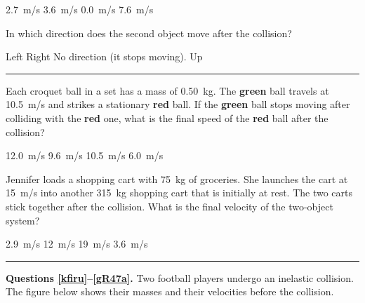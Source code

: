 \documentclass[]{exam}
\begin{document}
\begin{questions}
\begin{randomizechoices}
\correctchoice \SI{2.7}{m/s}
\choice \SI{3.6}{m/s}
\choice \SI{0.0}{m/s}
\choice \SI{7.6}{m/s}
\end{randomizechoices}

 \question \label{last_question}
 In which direction does the second object move after the collision?

\begin{randomizechoices}
\correctchoice Left
\choice Right
\choice No direction (it stops moving).
\choice Up
\end{randomizechoices}

\bigskip

\hrule

\clearpage
\question
Each croquet ball in a set has a mass of \SI{0.50}{kg}. The \textbf{green} ball travels at \SI{10.5}{m/s} and strikes a stationary \textbf{red} ball. If the \textbf{green} ball stops moving after colliding with the \textbf{red} one, what is the final speed of the \textbf{red} ball after the collision?

\begin{randomizechoices}
\choice \SI{12.0}{m/s}
\choice \SI{9.6}{m/s}
\correctchoice \SI{10.5}{m/s}
\choice \SI{6.0}{m/s}
\end{randomizechoices}

\question 
Jennifer loads a shopping cart with \SI{75}{kg} of groceries. She launches the cart at \SI{15}{m/s} into another \SI{315}{kg} shopping cart that is initially at rest. The two carts stick together after the collision. What is the final velocity of the two-object system?

\begin{randomizechoices}
\correctchoice \SI{2.9}{m/s}
\choice \SI{12}{m/s}
\choice \SI{19}{m/s}
\choice \SI{3.6}{m/s}
\end{randomizechoices}

\bigskip

\hrule

\begin{EnvUplevel}
\textbf{Questions \ref{kfiru}--\ref{gR47a}.} Two football players undergo an inelastic collision. The figure below shows their masses and their velocities before the collision.
\end{EnvUplevel}



\end{questions}
\end{document}
